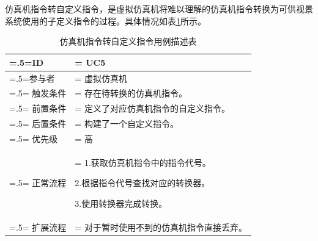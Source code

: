 {\par
仿真机指令转自定义指令，是虚拟仿真机将难以理解的仿真机指令转换为可供视景系统使用的子定义指令的过程。具体情况如表\ref{usecase5}所示。
\begin{table}[htbp]
    \begin{center}
        \caption{仿真机指令转自定义指令用例描述表}
        \label{usecase5}
        \renewcommand\arraystretch{1.5}
        \begin{tabularx}{0.8\textwidth}{ 
            | >{\centering\arraybackslash\hsize=.5\hsize\linewidth=\hsize}X 
            | >{\raggedright\arraybackslash\hsize=1.5\hsize\linewidth=\hsize}X 
            | }
            \hline
            \textbf{ID} & \textbf{UC5}\\
            \hline
            参与者 & 虚拟仿真机\\
            \hline
            触发条件 & 存在待转换的仿真机指令。\\
            \hline
            前置条件 & 定义了对应仿真机指令的自定义指令。\\
            \hline
            后置条件 & 构建了一个自定义指令。\\
            \hline
            优先级 & 高\\
            \hline
            正常流程 & 1.获取仿真机指令中的指令代号。\par 2.根据指令代号查找对应的转换器。\par 3.使用转换器完成转换。\\
            \hline
            扩展流程 & 对于暂时使用不到的仿真机指令直接丢弃。\\
            \hline
        \end{tabularx}
    \end{center}
\end{table}

}
